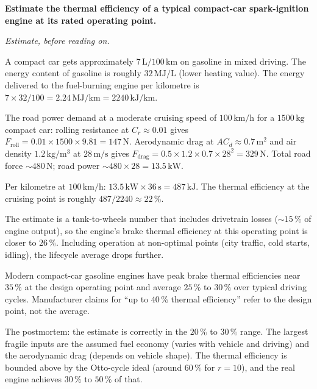 \begin{estimation}
\textbf{Estimate the thermal efficiency of a typical compact-car
spark-ignition engine at its rated operating point.}

\smallskip
\textit{Estimate, before reading on.}

\smallskip
A compact car gets approximately $7\,\text{L}/100\,\text{km}$ on
gasoline in mixed driving. The energy content of gasoline is roughly
$32\,\text{MJ}/\text{L}$ (lower heating value). The energy delivered
to the fuel-burning engine per kilometre is $7 \times 32/100 = 2.24
\,\text{MJ}/\text{km} = 2240\,\text{kJ}/\text{km}$.

The road power demand at a moderate cruising speed of $100\,\text{km}/
\text{h}$ for a $1500\,\text{kg}$ compact car: rolling resistance at
$C_r \approx 0.01$ gives $F_{\text{roll}} = 0.01 \times 1500 \times
9.81 = 147\,\text{N}$. Aerodynamic drag at $A C_d \approx 0.7\,
\text{m}^2$ and air density $1.2\,\text{kg}/\text{m}^3$ at
$28\,\text{m}/\text{s}$ gives $F_{\text{drag}} = 0.5 \times 1.2 \times
0.7 \times 28^2 = 329\,\text{N}$. Total road force $\sim 480\,\text{N}$;
road power $\sim 480 \times 28 = 13.5\,\text{kW}$.

Per kilometre at $100\,\text{km}/\text{h}$: $13.5\,\text{kW} \times
36\,\text{s} = 487\,\text{kJ}$. The thermal efficiency at the
cruising point is roughly $487/2240 \approx 22\,\%$.

The estimate is a tank-to-wheels number that includes drivetrain
losses ($\sim 15\,\%$ of engine output), so the engine's brake thermal
efficiency at this operating point is closer to $26\,\%$. Including
operation at non-optimal points (city traffic, cold starts, idling),
the lifecycle average drops further.

Modern compact-car gasoline engines have peak brake thermal
efficiencies near $35\,\%$ at the design operating point and average
$25\,\%$ to $30\,\%$ over typical driving cycles. Manufacturer claims
for ``up to $40\,\%$ thermal efficiency'' refer to the design point,
not the average.

The postmortem: the estimate is correctly in the $20\,\%$ to $30\,\%$
range. The largest fragile inputs are the assumed fuel economy
(varies with vehicle and driving) and the aerodynamic drag (depends
on vehicle shape). The thermal efficiency is bounded above by the
Otto-cycle ideal (around $60\,\%$ for $r = 10$), and the real engine
achieves $30\,\%$ to $50\,\%$ of that.
\end{estimation}

